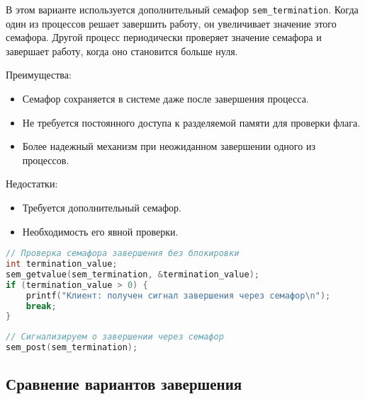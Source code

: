 \documentclass[a4paper,12pt]{article}
\begin{document}
В этом варианте используется дополнительный семафор \texttt{sem\_termination}. Когда один из процессов решает завершить работу, он увеличивает значение этого семафора. Другой процесс периодически проверяет значение семафора и завершает работу, когда оно становится больше нуля.

Преимущества:
\begin{itemize}
    \item Семафор сохраняется в системе даже после завершения процесса.
    \item Не требуется постоянного доступа к разделяемой памяти для проверки флага.
    \item Более надежный механизм при неожиданном завершении одного из процессов.
\end{itemize}

Недостатки:
\begin{itemize}
    \item Требуется дополнительный семафор.
    \item Необходимость его явной проверки.
\end{itemize}

\begin{lstlisting}[language=C, caption=Проверка семафора завершения]
// Проверка семафора завершения без блокировки
int termination_value;
sem_getvalue(sem_termination, &termination_value);
if (termination_value > 0) {
    printf("Клиент: получен сигнал завершения через семафор\n");
    break;
}
\end{lstlisting}

\begin{lstlisting}[language=C, caption=Сигнализация о завершении через семафор]
// Сигнализируем о завершении через семафор
sem_post(sem_termination);
\end{lstlisting}

\subsection{Сравнение вариантов завершения}
\end{document}
